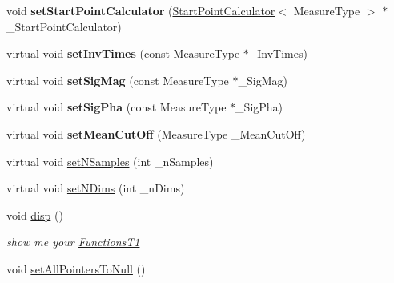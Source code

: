 \begin{DoxyCompactItemize}
\item 
\hypertarget{class_ox_1_1_calculator_t1_a89628a47da5bf7baddcd87f687613096}{void {\bfseries set\-Start\-Point\-Calculator} (\hyperlink{class_ox_1_1_start_point_calculator}{Start\-Point\-Calculator}$<$ Measure\-Type $>$ $\ast$\-\_\-\-Start\-Point\-Calculator)}\label{class_ox_1_1_calculator_t1_a89628a47da5bf7baddcd87f687613096}

\item 
\hypertarget{class_ox_1_1_calculator_t1_a102f4865fc2424e6f30bcbd5bf3580f3}{virtual void {\bfseries set\-Inv\-Times} (const Measure\-Type $\ast$\-\_\-\-Inv\-Times)}\label{class_ox_1_1_calculator_t1_a102f4865fc2424e6f30bcbd5bf3580f3}

\item 
\hypertarget{class_ox_1_1_calculator_t1_a4d0327b2105ef6b99cfacb5d37075a5a}{virtual void {\bfseries set\-Sig\-Mag} (const Measure\-Type $\ast$\-\_\-\-Sig\-Mag)}\label{class_ox_1_1_calculator_t1_a4d0327b2105ef6b99cfacb5d37075a5a}

\item 
\hypertarget{class_ox_1_1_calculator_t1_a81b313cfacfd8880e39c0e2cd87c912c}{virtual void {\bfseries set\-Sig\-Pha} (const Measure\-Type $\ast$\-\_\-\-Sig\-Pha)}\label{class_ox_1_1_calculator_t1_a81b313cfacfd8880e39c0e2cd87c912c}

\item 
\hypertarget{class_ox_1_1_calculator_t1_a08da2ecf1ea83b83854fbe09a03de839}{virtual void {\bfseries set\-Mean\-Cut\-Off} (Measure\-Type \-\_\-\-Mean\-Cut\-Off)}\label{class_ox_1_1_calculator_t1_a08da2ecf1ea83b83854fbe09a03de839}

\item 
virtual void \hyperlink{class_ox_1_1_calculator_t1_af5d84e582c3793ebe168f24245f04de1}{set\-N\-Samples} (int \-\_\-n\-Samples)
\item 
virtual void \hyperlink{class_ox_1_1_calculator_t1_abe8decf5aba8ba0de2b6ca76ec9c1386}{set\-N\-Dims} (int \-\_\-n\-Dims)
\item 
\hypertarget{class_ox_1_1_calculator_t1_ab820a5163966ce07d7be7f323ead23ae}{void \hyperlink{class_ox_1_1_calculator_t1_ab820a5163966ce07d7be7f323ead23ae}{disp} ()}\label{class_ox_1_1_calculator_t1_ab820a5163966ce07d7be7f323ead23ae}

\begin{DoxyCompactList}\small\item\em show me your \hyperlink{class_ox_1_1_functions_t1}{Functions\-T1} \end{DoxyCompactList}\item 
\hypertarget{class_ox_1_1_calculator_t1_a11f02c5b0ae3f9b0f8a74044a170ee18}{void \hyperlink{class_ox_1_1_calculator_t1_a11f02c5b0ae3f9b0f8a74044a170ee18}{set\-All\-Pointers\-To\-Null} ()}\label{class_ox_1_1_calculator_t1_a11f02c5b0ae3f9b0f8a74044a170ee18}


\end{DoxyCompactItemize}
